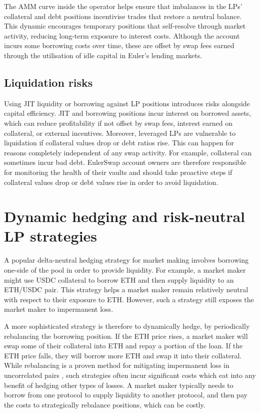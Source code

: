 \documentclass{article}
\begin{document}
The AMM curve inside the operator helps ensure that imbalances in the LPs' collateral and debt positions incentivise trades that restore a neutral balance. This dynamic encourages temporary positions that self-resolve through market activity, reducing long-term exposure to interest costs. Although the account incurs some borrowing costs over time, these are offset by swap fees earned through the utilisation of idle capital in Euler's lending markets.

\subsection{Liquidation risks}

Using JIT liquidity or borrowing against LP positions introduces risks alongside capital efficiency. JIT and borrowing positions incur interest on borrowed assets, which can reduce profitability if not offset by swap fees, interest earned on collateral, or external incentives. Moreover, leveraged LPs are vulnerable to liquidation if collateral values drop or debt ratios rise. This can happen for reasons completely independent of any swap activity. For example, collateral can sometimes incur bad debt. EulerSwap account owners are therefore responsible for monitoring the health of their vaults and should take proactive steps if collateral values drop or debt values rise in order to avoid liquidation. 

\section{Dynamic hedging and risk-neutral LP strategies}

A popular delta-neutral hedging strategy for market making involves borrowing one-side of the pool in order to provide liquidity. For example, a market maker might use USDC collateral to borrow ETH and then supply liquidity to an ETH/USDC pair. This strategy helps a market maker remain relatively neutral with respect to their exposure to ETH. However, such a strategy still exposes the market maker to impermanent loss.  

A more sophisticated strategy is therefore to dynamically hedge, by periodically rebalancing the borrowing position. If the ETH price rises, a market maker will swap some of their collateral into ETH and repay a portion of the loan. If the ETH price falls, they will borrow more ETH and swap it into their collateral. While rebalancing is a proven method for mitigating impermanent loss in uncorrelated pairs \cite{adams2021uniswapv3}, such strategies often incur significant costs which eat into any benefit of hedging other types of losses. A market maker typically needs to borrow from one protocol to supply liquidity to another protocol, and then pay the costs to strategically rebalance positions, which can be costly. 
\end{document}
